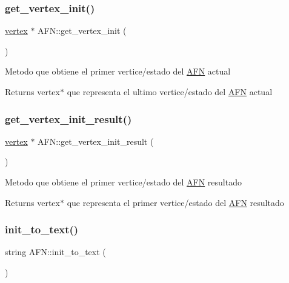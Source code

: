 \subsubsection{\texorpdfstring{get\+\_\+vertex\+\_\+init()}{get\_vertex\_init()}}
{\footnotesize\ttfamily \hyperlink{structvertex}{vertex} $\ast$ A\+F\+N\+::get\+\_\+vertex\+\_\+init (\begin{DoxyParamCaption}{ }\end{DoxyParamCaption})}

Metodo que obtiene el primer vertice/estado del \hyperlink{class_a_f_n}{A\+FN} actual \begin{DoxyReturn}{Returns}
vertex$\ast$ que representa el ultimo vertice/estado del \hyperlink{class_a_f_n}{A\+FN} actual 
\end{DoxyReturn}
\hypertarget{class_a_f_n_a925f7daa4874270adb107f1c5f9aa16d}{}\label{class_a_f_n_a925f7daa4874270adb107f1c5f9aa16d} 
\subsubsection{\texorpdfstring{get\+\_\+vertex\+\_\+init\+\_\+result()}{get\_vertex\_init\_result()}}
{\footnotesize\ttfamily \hyperlink{structvertex}{vertex} $\ast$ A\+F\+N\+::get\+\_\+vertex\+\_\+init\+\_\+result (\begin{DoxyParamCaption}{ }\end{DoxyParamCaption})}

Metodo que obtiene el primer vertice/estado del \hyperlink{class_a_f_n}{A\+FN} resultado \begin{DoxyReturn}{Returns}
vertex$\ast$ que representa el primer vertice/estado del \hyperlink{class_a_f_n}{A\+FN} resultado 
\end{DoxyReturn}
\hypertarget{class_a_f_n_ab84edc1301ea0d4364565c718cc013ad}{}\label{class_a_f_n_ab84edc1301ea0d4364565c718cc013ad} 
\subsubsection{\texorpdfstring{init\+\_\+to\+\_\+text()}{init\_to\_text()}}
{\footnotesize\ttfamily string A\+F\+N\+::init\+\_\+to\+\_\+text (\begin{DoxyParamCaption}{ }\end{DoxyParamCaption})}

